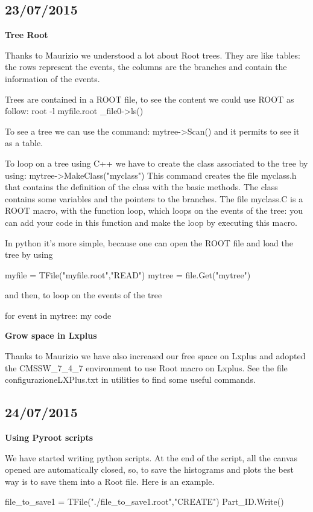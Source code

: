 \subsection{23/07/2015}

\textbf{Tree Root}

Thanks to Maurizio we understood a lot about Root trees. They are like tables: the rows represent the events, the columns are the branches and contain the information of the events. 

Trees are contained in a ROOT file, to see the content we could use ROOT as follow:
root -l myfile.root
\_file0->ls()

To see a tree we can use the command:
mytree->Scan()
and it permits to see it as a table.

To loop on a tree using C++ we have to create the class associated to the tree by using:
mytree->MakeClass("myclass")
This command creates the file myclass.h that contains the definition of the class with the basic methods. The class contains some variables and the pointers to the branches.
The file myclass.C is a ROOT macro, with the function loop, which loops on the events of the tree: you can add your code in this function and make the loop by executing this macro.

In python it's more simple, because one can open the ROOT file and load the tree by using 

myfile = TFile("myfile.root","READ")
mytree = file.Get("mytree")

and then, to loop on the events of the tree

for event in mytree:
	my code

\textbf{Grow space in Lxplus}

Thanks to Maurizio we have also increased our free space on Lxplus and adopted the CMSSW\_7\_4\_7 environment to use Root macro on Lxplus. See the file configurazioneLXPlus.txt in utilities to find some useful commands.

\subsection{24/07/2015}

\textbf{Using Pyroot scripts}

We have started writing python scripts. At the end of the script, all the canvas opened are automatically closed, so, to save the histograms and plots the best way is to save them into a Root file.
Here is an example.

file\_to\_save1 = TFile("./file\_to\_save1.root","CREATE")
Part\_ID.Write()


